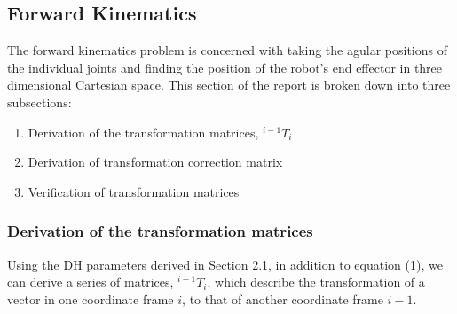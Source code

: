 \documentclass[a4paper]{article}
\begin{document}
\subsection{Forward Kinematics}
The forward kinematics problem is concerned with taking the agular positions of the individual joints and finding the position of the robot's end effector in three dimensional Cartesian space. This section of the report is broken down into three subsections:
\begin{enumerate}
	\item Derivation of the transformation matrices, $^{i-1} T_i$
	\item Derivation of transformation correction matrix 
	\item Verification of transformation matrices
\end{enumerate}

\subsubsection{Derivation of the transformation matrices}
Using the DH parameters derived in Section 2.1, in addition to equation (1), we can derive a series of matrices, $^{i-1} T_i$, which describe the transformation of a vector in one coordinate frame $i$, to that of another coordinate frame $i-1$.\\
\end{document}

